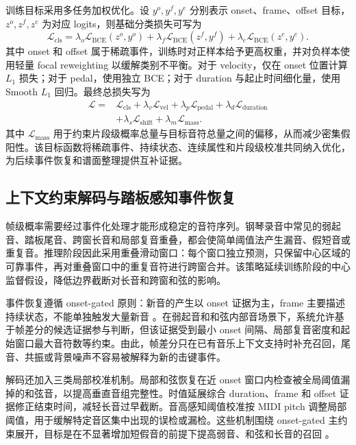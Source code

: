 \documentclass[UTF8,a4paper,zihao=-4]{ctexart}
\begin{document}
训练目标采用多任务加权优化。设 $y^o,y^f,y^e$ 分别表示 onset、frame、offset 目标，$z^o,z^f,z^e$ 为对应 logits，则基础分类损失可写为
\begin{equation}
\mathcal{L}_{\mathrm{cls}}
=\lambda_o \mathcal{L}_{\mathrm{BCE}}(z^o,y^o)
+\lambda_f \mathcal{L}_{\mathrm{BCE}}(z^f,y^f)
+\lambda_e \mathcal{L}_{\mathrm{BCE}}(z^e,y^e).
\end{equation}
其中 onset 和 offset 属于稀疏事件，训练时对正样本给予更高权重，并对负样本使用轻量 focal reweighting 以缓解类别不平衡。对于 velocity，仅在 onset 位置计算 $L_1$ 损失；对于 pedal，使用独立 BCE；对于 duration 与起止时间细化量，使用 Smooth $L_1$ 回归。最终总损失写为
\begin{equation}
\begin{aligned}
\mathcal{L}=&\mathcal{L}_{\mathrm{cls}}
+\lambda_v\mathcal{L}_{\mathrm{vel}}
+\lambda_p\mathcal{L}_{\mathrm{pedal}}
+\lambda_d\mathcal{L}_{\mathrm{duration}} \\
&+\lambda_s\mathcal{L}_{\mathrm{shift}}
+\lambda_m\mathcal{L}_{\mathrm{mass}}.
\end{aligned}
\end{equation}
其中 $\mathcal{L}_{\mathrm{mass}}$ 用于约束片段级概率总量与目标音符总量之间的偏移，从而减少密集假阳性。该目标函数将稀疏事件、持续状态、连续属性和片段级校准共同纳入优化，为后续事件恢复和谱面整理提供互补证据。

\subsection{上下文约束解码与踏板感知事件恢复}

帧级概率需要经过事件化处理才能形成稳定的音符序列。钢琴录音中常见的弱起音、踏板尾音、跨窗长音和局部复音重叠，都会使简单阈值法产生漏音、假短音或重复音。推理阶段因此采用重叠滑动窗口：每个窗口独立预测，只保留中心区域的可靠事件，再对重叠窗口中的重复音符进行跨窗合并。该策略延续训练阶段的中心监督假设，降低边界截断对长音和跨窗和弦的影响。

事件恢复遵循 onset-gated 原则：新音的产生以 onset 证据为主，frame 主要描述持续状态，不能单独触发大量新音 \cite{hawthorne2018onsets}。在弱起音和和弦内部音场景下，系统允许基于帧差分的候选证据参与判断，但该证据受到最小 onset 间隔、局部复音密度和起始窗口最大音符数等约束。由此，帧差分只在已有音乐上下文支持时补充召回，尾音、共振或背景噪声不容易被解释为新的击键事件。

解码还加入三类局部校准机制。局部和弦恢复在近 onset 窗口内检查被全局阈值漏掉的和弦音，以提高垂直音组完整性。时值延展综合 duration、frame 和 offset 证据修正结束时间，减轻长音过早截断。音高感知阈值校准按 MIDI pitch 调整局部阈值，用于缓解特定音区集中出现的误检或漏检。这些机制围绕 onset-gated 主约束展开，目标是在不显著增加短假音的前提下提高弱音、和弦和长音的召回 \cite{hawthorne2018onsets,kong2021highres,toyama2023hft}。
\end{document}
